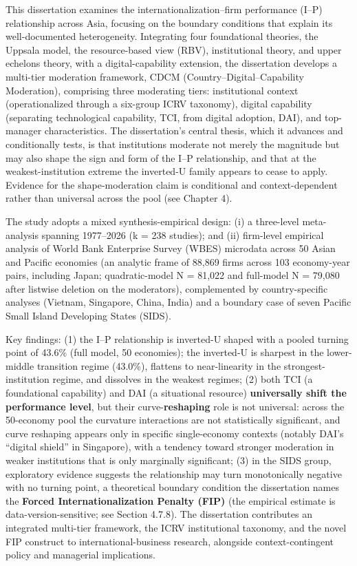 \documentclass[
  a4paper,
  13pt]{extreport}
\begin{document}
This dissertation examines the internationalization--firm performance
(I--P) relationship across Asia, focusing on the boundary conditions
that explain its well-documented heterogeneity. Integrating four
foundational theories, the Uppsala model, the resource-based view (RBV),
institutional theory, and upper echelons theory, with a
digital-capability extension, the dissertation develops a multi-tier
moderation framework, CDCM (Country--Digital--Capability Moderation),
comprising three moderating tiers: institutional context
(operationalized through a six-group ICRV taxonomy), digital capability
(separating technological capability, TCI, from digital adoption, DAI),
and top-manager characteristics. The dissertation's central thesis,
which it advances and conditionally tests, is that institutions moderate
not merely the magnitude but may also shape the sign and form of the
I--P relationship, and that at the weakest-institution extreme the
inverted-U family appears to cease to apply. Evidence for the
shape-moderation claim is conditional and context-dependent rather than
universal across the pool (see Chapter 4).

The study adopts a mixed synthesis-empirical design: (i) a three-level
meta-analysis spanning 1977--2026 (k = 238 studies); and (ii) firm-level
empirical analysis of World Bank Enterprise Survey (WBES) microdata
across 50 Asian and Pacific economies (an analytic frame of 88,869 firms
across 103 economy-year pairs, including Japan; quadratic-model N =
81,022 and full-model N = 79,080 after listwise deletion on the
moderators), complemented by country-specific analyses (Vietnam,
Singapore, China, India) and a boundary case of seven Pacific Small
Island Developing States (SIDS).

Key findings: (1) the I--P relationship is inverted-U shaped with a
pooled turning point of 43.6\% (full model, 50 economies); the
inverted-U is sharpest in the lower-middle transition regime (43.0\%),
flattens to near-linearity in the strongest-institution regime, and
dissolves in the weakest regimes; (2) both TCI (a foundational
capability) and DAI (a situational resource) \textbf{universally shift
the performance level}, but their curve-\textbf{reshaping} role is not
universal: across the 50-economy pool the curvature interactions are not
statistically significant, and curve reshaping appears only in specific
single-economy contexts (notably DAI's ``digital shield'' in Singapore),
with a tendency toward stronger moderation in weaker institutions that
is only marginally significant; (3) in the SIDS group, exploratory
evidence suggests the relationship may turn monotonically negative with
no turning point, a theoretical boundary condition the dissertation
names the \textbf{Forced Internationalization Penalty (FIP)} (the
empirical estimate is data-version-sensitive; see Section 4.7.8). The
dissertation contributes an integrated multi-tier framework, the ICRV
institutional taxonomy, and the novel FIP construct to
international-business research, alongside context-contingent policy and
managerial implications.
\end{document}
